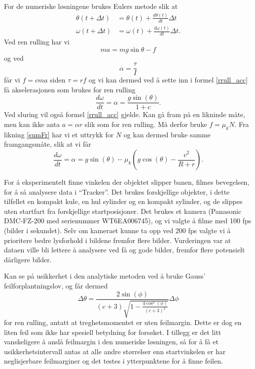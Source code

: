 \documentclass[5p]{elsarticle}
\begin{document}
	For de numeriske løsningene brukes Eulers metode slik at
	\begin{align}
	    \theta (t + \Delta t) &= \theta (t) + \frac{d \theta (t)}{dt} \Delta t \label{euler_theta}\\
	    \omega (t + \Delta t) &= \omega (t) + \frac{d\omega (t)}{dt}\Delta t . \label{euler_omega}
	\end{align}
	Ved ren rulling har vi
	\begin{equation}\label{rrull_acc}
	    ma = mg\sin \theta - f
	\end{equation}
	og ved
	\begin{equation}
	    \alpha = \frac{\tau}{I}
	\end{equation}
	får vi $f = cma$ siden $\tau = rf$ og vi kan dermed ved å sette inn i formel \eqref{rrull_acc} få akselerasjonen som brukes for ren rulling
	\begin{equation}
	    \frac{d \omega}{dt} = \alpha = \frac{g \sin(\theta)}{1+c} .
	\end{equation}
	Ved sluring vil også formel \eqref{rrull_acc} gjelde. Kan gå fram på en likninde måte, men kan ikke anta $a = \alpha r$ slik som for ren rulling. Må derfor bruke $f = \mu_k N$. Fra likning \eqref{sumFr} har vi et uttrykk for $N$ og kan dermed bruke samme framgangsmåte, slik at vi får
	\begin{equation}
	    \frac{d \omega}{dt} = \alpha = g \sin(\theta) - \mu_k \left( g\cos(\theta) - \frac{v^2}{R + r} \right) .
	\end{equation}
	
	For å eksperimentelt finne vinkelen der objektet slipper banen, filmes bevegelsen, for å så analysere data i ``Tracker''. Det brukes forskjellige objekter, i dette tilfellet en kompakt kule, en hul sylinder og en kompakt sylinder, og de slippes uten startfart fra forskjellige startposisjoner. Det brukes et kamera (Panasonic DMC-FZ-200 med serienummer WT6EA006745), og vi valgte å filme med 100 fps (bilder i sekundet). Selv om kameraet kunne ta opp ved 200 fps valgte vi å prioritere bedre lysforhold i bildene fremfor flere bilder. Vurderingen var at dataen ville bli lettere å analysere ved få og gode bilder, fremfor flere potensielt dårligere bilder. 
	
	Kan se på usikkerhet i den analytiske metoden ved å bruke Gauss' feilforplantningslov, og får dermed
	\begin{equation}
	    \Delta \theta = \frac{2\sin (\phi)}{(c+3)\sqrt{1-\frac{4\cos ^2 (\phi)}{(c+3)^2}}} \Delta \phi
	\end{equation}
	for ren rulling, antatt at treghetsmomentet er uten feilmargin. Dette er dog en liten feil som ikke har spesiell betydning for forsøket. I tillegg er det litt vanskeligere å anslå feilmargin i den numeriske løsningen, så for å få et usikkerhetsintervall antas at alle andre størrelser enn startvinkelen er har neglisjerbare feilmarginer og det testes i ytterpunktene for å finne feilen.
	
\end{document}
